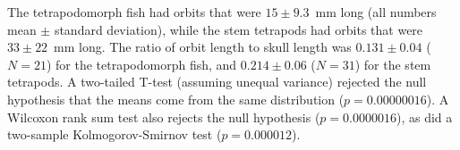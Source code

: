  The tetrapodomorph fish had orbits that were $15 \pm 9.3$~mm long (all numbers mean $\pm$ standard deviation), while the stem tetrapods had orbits that were $33 \pm 22$~mm long. The ratio of orbit length to skull length was $0.131 \pm 0.04$  ($N=21$) for the tetrapodomorph fish, and $0.214 \pm  0.06$ ($N=31$) for the stem tetrapods. A two-tailed  T-test (assuming unequal variance) rejected the null hypothesis that the means come from the same distribution ($p = 0.00000016$). A Wilcoxon rank sum test also rejects the null hypothesis ($p = 0.0000016$), as did a two-sample Kolmogorov-Smirnov test ($p = 0.000012$). 